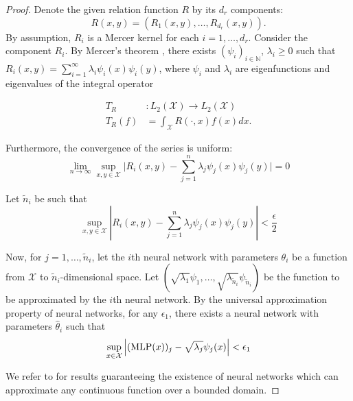 \begin{proof}
	\hphantom{~}

	Denote the given relation function \(R\) by its \(d_r\) components:
	\begin{equation}
		R(x,y) = (R_1(x,y), \ldots, R_{d_r}(x,y)).
	\end{equation}
	By assumption, \(R_i\) is a Mercer kernel for each \(i = 1, \ldots, d_r\). Consider the component \(R_i\). By Mercer's theorem \citep{mercerFunctionsPositive1909, sunMercerTheorem2005, universal}, there exists \((\psi_i)_{i \in \mathbb{N}}\), \(\lambda_i \geq 0\) such that \(R_i(x,y) = \sum_{i=1}^{\infty}{\lambda_i \psi_i(x) \psi_i(y)}\), where \(\psi_i\) and \(\lambda_i\) are eigenfunctions and eigenvalues of the integral operator

	\begin{align*}
		T_R&: L_2(\mathcal{X}) \to L_2(\mathcal{X}) \\
		T_R(f) &= \int_{\mathcal{X}}{R(\cdot, x) f(x) dx}.
	\end{align*}

	Furthermore, the convergence of the series is uniform:
	\begin{equation}
		\lim_{n \to \infty} \sup_{x,y \in \mathcal{X}} \lvert R_i(x,y) - \sum_{j=1}^{n}{\lambda_j \psi_j(x) \psi_j(y) \rvert} = 0
	\end{equation}

	Let \(\tilde{n}_i\) be such that
	\begin{equation}
		\label{eq:proof_mercer_thm_unif_abs_cv}
		\sup_{x,y \in \mathcal{X}} \left\lvert R_i(x,y) - \sum_{j=1}^{n}{\lambda_j \psi_j(x) \psi_j(y)} \right\rvert < \frac{\epsilon}{2}
	\end{equation}

	Now, for \(j = 1, \ldots, \tilde{n}_i\), let the \(i\)th neural network with parameters \(\theta_i\) be a function from \(\mathcal{X}\) to \(\tilde{n}_i\)-dimensional space. Let \((\sqrt{\lambda_1} \psi_1, \ldots, \sqrt{\lambda_{\tilde{n}_i}} \psi_{\tilde{n}_i})\) be the function to be approximated by the \(i\)th neural network. By the universal approximation property of neural networks, for any \(\epsilon_1\), there exists a neural network with parameters \(\hat{\theta}_i\) such that
	\begin{equation}
		\label{eq:proof_NN_UAP}
		\sup_{x\in \mathcal{X}}{\left\lvert (\text{MLP}(x))_j - \sqrt{\lambda_j} \psi_j(x) \right\lvert } < \epsilon_1
	\end{equation}

	We refer to \citep{hornikMultilayerFeedforward1989, cybenkoApproximationSuperpositions1989, barronUniversalApproximation1993} for results guaranteeing the existence of neural networks which can approximate any continuous function over a bounded domain.


\end{proof}
